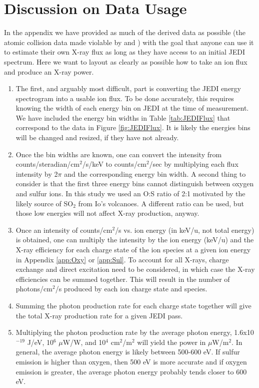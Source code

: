 \section{Discussion on Data Usage}

In the appendix we have provided as much of the derived data as possible (the atomic collision data made violable by \citet{schultz2019} and \citet{gharibnejad2019}) with the goal that anyone can use it to estimate their own X-ray flux as long as they have access to an initial JEDI spectrum.
Here we want to layout as clearly as possible how to take an ion flux and produce an X-ray power.

\begin{enumerate}
    \item The first, and arguably most difficult, part is converting the JEDI energy spectrogram into a usable ion flux.
    To be done accurately, this requires knowing the width of each energy bin on JEDI at the time of measurement.
    We have included the energy bin widths in Table \ref{tab:JEDIFlux} that correspond to the data in Figure \ref{fig:JEDIFlux}.
    It is likely the energies bins will be changed and resized, if they have not already.
    \item Once the bin widths are known, one can convert the intensity from counts/steradian/cm$^2$/s/keV to counts/cm$^2$/sec by multiplying each flux intensity by 2$\pi$ and the corresponding energy bin width.
    A second thing to consider is that the first three energy bins cannot distinguish between oxygen and sulfur ions.
    In this study we used an O:S ratio of 2:1 motivated by the likely source of SO$_2$ from Io's volcanoes.
    A different ratio can be used, but those low energies will not affect X-ray production, anyway.
    \item Once an intensity of counts/cm$^2$/s vs. ion energy (in keV/u, not total energy) is obtained, one can multiply the intensity by the ion energy (keV/u) and the X-ray efficiency for each charge state of the ion species at a given ion energy in Appendix \ref{app:Oxy} or \ref{app:Sul}.
    To account for all X-rays, charge exchange and direct excitation need to be considered, in which case the X-ray efficiencies can be summed together.
    This will result in the number of photons/cm$^2$/s produced by each ion charge state and species.
    \item Summing the photon production rate for each charge state together will give the total X-ray production rate  for a given JEDI pass.
    \item Multiplying the photon production rate by the average photon energy, 1.6x10$^{-19}$ J/eV, 10$^6$ $\mu$W/W, and 10$^4$ cm$^2$/m$^2$ will yield the power in $\mu$W/m$^2$.
    In general, the average photon energy is likely between 500-600 eV.
    If sulfur emission is higher than oxygen, then 500 eV is more accurate and if oxygen emission is greater, the average photon energy probably tends closer to 600 eV.
\end{enumerate}

